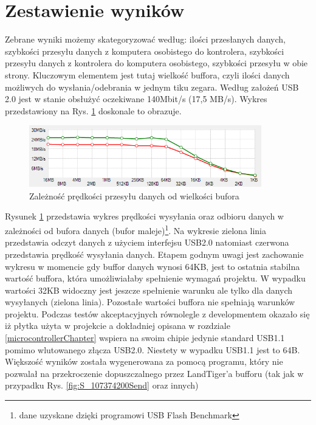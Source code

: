 \documentclass{BscUS}
\begin{document}
\section{Zestawienie wyników}
\indent Zebrane wyniki możemy skategoryzować według: ilości przesłanych danych, szybkości przesyłu danych z komputera osobistego do kontrolera, szybkości przesyłu danych z kontrolera do komputera osobistego, szybkości przesyłu w obie strony. Kluczowym elementem jest tutaj wielkość buffora, czyli ilości danych możliwych do wysłania/odebrania w jednym tiku zegara.
\newline
\indent Według założeń USB 2.0 jest w stanie obsłużyć oczekiwane 140Mbit/s (17,5 MB/s). Wykres przedstawiony na Rys. \ref{fig:speedTest} doskonale to obrazuje.
\begin{figure}[H]
\centering
\includegraphics[width=0.9\textwidth]{./img/speedTest}
\caption{Zależność prędkości przesyłu danych od wielkości bufora}
\label{fig:speedTest}
\end{figure}
Rysunek \ref{fig:speedTest} przedstawia wykres prędkości wysyłania oraz odbioru danych w zależności od bufora danych (bufor maleje)\footnote{dane uzyskane dzięki programowi USB Flash Benchmark\cite{USBFlashBenchmark}}. Na wykresie zielona linia przedstawia odczyt danych z użyciem interfejsu USB2.0 natomiast czerwona przedstawia prędkość wysyłania danych. Etapem godnym uwagi jest zachowanie wykresu w momencie gdy buffor danych wynosi 64KB, jest to ostatnia stabilna wartość buffora, która umożliwiałaby spełnienie wymagań projektu. W wypadku wartości 32KB widoczny jest jeszcze spełnienie warunku ale tylko dla danych wysyłanych (zielona linia). Pozostałe wartości buffora nie spełniają warunków projektu.
\newline
\indent Podczas testów akceptacyjnych równolegle z developmentem okazało się iż płytka użyta w projekcie a dokładniej opisana w rozdziale \ref{microcontrollerChapter} wspiera na swoim chipie jedynie standard USB1.1 pomimo wlutowanego złącza USB2.0. Niestety w wypadku USB1.1 jest to 64B. Większość wyników została wygenerowana za pomocą programu, który nie pozwalał na przekroczenie dopuszczalnego przez LandTiger'a bufforu (tak jak w przypadku Rys. \ref{fig:S_107374200Send} oraz innych)
\end{document}
